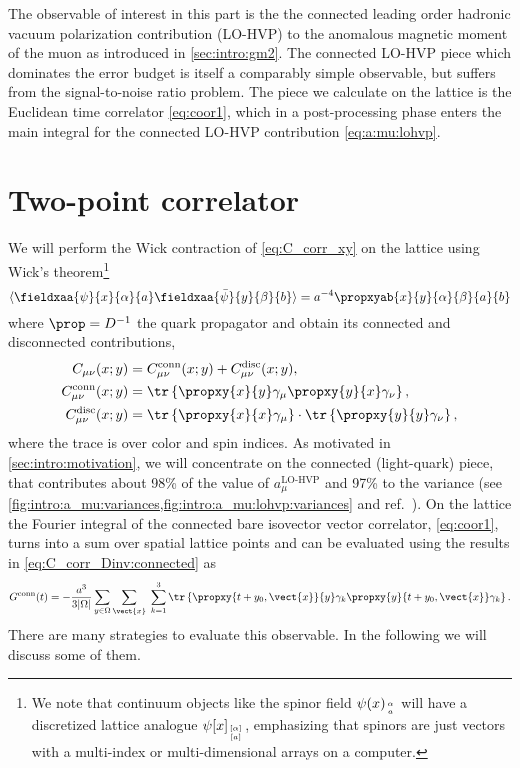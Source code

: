 The observable of interest in this part is the the connected leading order hadronic vacuum polarization contribution (LO-HVP) to the anomalous magnetic moment of the muon as introduced in \cref{sec:intro:gm2}.
The connected LO-HVP piece which dominates the error budget is itself a comparably simple observable, but suffers from the signal-to-noise ratio problem.
The piece we calculate on the lattice is the Euclidean time correlator \cref{eq:coor1}, which in a post-processing phase enters the main integral for the connected LO-HVP contribution \cref{eq:a:mu:lohvp}.


\section{Two-point correlator}
\label{sec:2pt-corr}

We will perform the Wick contraction of \cref{eq:C_corr_xy} on the lattice using Wick's theorem\footnote{We note that continuum objects like the spinor field $\psi(x)_{\alpha \atop a}$ will have a discretized lattice analogue $\psi[x]_{[\alpha] \atop [a]}$, emphasizing that spinors are just vectors with a multi-index or multi-dimensional arrays on a computer.}
\begin{equation}
\langle \fieldxaa{\psi}{x}{\alpha}{a} \fieldxaa{\bar{\psi}}{y}{\beta}{b} \rangle =
a^{-4} \propxyab{x}{y}{\alpha}{\beta}{a}{b}
\end{equation}
where $\prop = D^{-1}$ the quark propagator and obtain its connected and disconnected contributions,
\begin{align}
C_{\mu \nu}(x;y) &= C_{\mu \nu}^{\text{conn}}(x;y) + C_{\mu \nu}^{\text{disc}}(x;y), \\
C_{\mu \nu}^{\text{conn}}(x;y) &=
\tr \left\{
  \propxy{x}{y} \gamma_{\mu} \propxy{y}{x} \gamma_{\nu}
\right\}, \label{eq:C_corr_Dinv:connected} \\
C_{\mu \nu}^{\text{disc}}(x;y) &=
\tr \left\{ \propxy{x}{x} \gamma_{\mu} \right\}
\cdot
\tr \left\{ \propxy{y}{y} \gamma_{\nu} \right\},
\end{align}
where the trace is over color and spin indices.
As motivated in \cref{sec:intro:motivation}, we will concentrate on the connected (light-quark) piece, that contributes about 98\% of the value of $a_{\mu}^{\text{LO-HVP}}$ and 97\% to the variance (see \cref{fig:intro:a_mu:variances,fig:intro:a_mu:lohvp:variances} and ref.~\cite{snowmass:2025}).
On the lattice the Fourier integral of the connected bare isovector vector correlator, \cref{eq:coor1}, turns into a sum over spatial lattice points and can be evaluated using the results in \cref{eq:C_corr_Dinv:connected} as
\begin{equation} \label{eq:G:corr:connected}
G^{\text{conn}}(t) =
- \frac{a^{3}}{3 \lvert \Omega \rvert}
\sum_{y \in \Omega}
\sum_{\vect{x}} \;
\sum_{k=1}^{3}
\tr \left\{
  \propxy{t+y_0, \vect{x}}{y} \gamma_k \propxy{y}{t+y_0, \vect{x}} \gamma_k
\right\}.
\end{equation}
There are many strategies to evaluate this observable. In the following we will discuss some of them.

